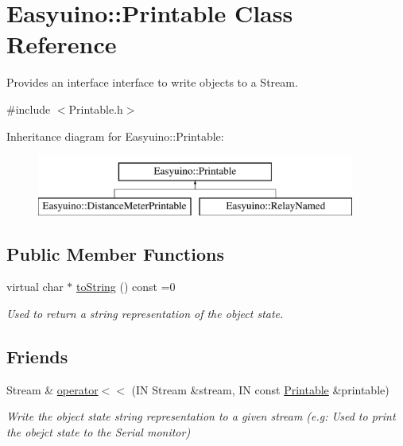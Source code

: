 \hypertarget{class_easyuino_1_1_printable}{}\section{Easyuino\+:\+:Printable Class Reference}
\label{class_easyuino_1_1_printable}


Provides an interface interface to write objects to a Stream.  




{\ttfamily \#include $<$Printable.\+h$>$}

Inheritance diagram for Easyuino\+:\+:Printable\+:\begin{figure}[H]
\begin{center}
\leavevmode
\includegraphics[height=2.000000cm]{class_easyuino_1_1_printable}
\end{center}
\end{figure}
\subsection*{Public Member Functions}
\begin{DoxyCompactItemize}
\item 
virtual char $\ast$ \hyperlink{class_easyuino_1_1_printable_a49ae1c60dc0404600ee122c6c2684155}{to\+String} () const =0
\begin{DoxyCompactList}\small\item\em Used to return a string representation of the object state. \end{DoxyCompactList}\end{DoxyCompactItemize}
\subsection*{Friends}
\begin{DoxyCompactItemize}
\item 
\mbox{\label{class_easyuino_1_1_printable_a50c7f93c6a84fde9f1f97f1185d853d9}} 
Stream \& \hyperlink{class_easyuino_1_1_printable_a50c7f93c6a84fde9f1f97f1185d853d9}{operator$<$$<$} (IN Stream \&stream, IN const \hyperlink{class_easyuino_1_1_printable}{Printable} \&printable)
\begin{DoxyCompactList}\small\item\em Write the object state string representation to a given stream (e.\+g\+: Used to print the obejct state to the Serial monitor) \end{DoxyCompactList}\end{DoxyCompactItemize}


